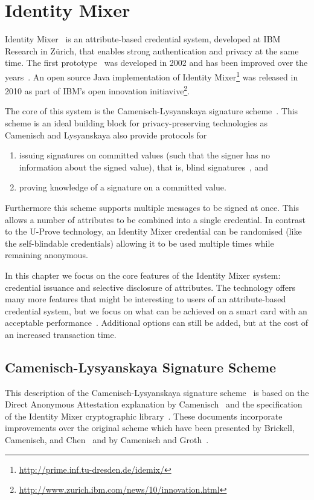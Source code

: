 \chapter{Identity Mixer}

Identity Mixer~\cite{IdemixCrypto2012} is an attribute-based credential system,
developed at IBM Research in Z\"urich, that enables strong authentication and
privacy at the same time. The first prototype~\cite{CamenischH02} was developed
in 2002 and has been improved over the years~\cite{}. An open source Java implementation
of Identity Mixer\footnote{\url{http://prime.inf.tu-dresden.de/idemix/}} was
released in 2010 as part of IBM's open innovation
initiavive\footnote{\url{http://www.zurich.ibm.com/news/10/innovation.html}}.

The core of this system is the Camenisch-Lysyanskaya signature
scheme~\cite{CamenischLysyanskaya2002,Lysyanskaya2002}. This scheme is an ideal
building block for privacy-preserving technologies as Camenisch and Lysyanskaya
also provide protocols for
\begin{enumerate}
  \item issuing signatures on committed values (such that the signer has no
    information about the signed value), that is, blind
    signatures~\cite{Chaum1983}, and
  \item proving knowledge of a signature on a committed value.
\end{enumerate}
Furthermore this scheme supports multiple messages to be signed at once. This
allows a number of attributes to be combined into a single credential. In
contrast to the U-Prove technology, an Identity Mixer credential can be
randomised (like the self-blindable credentials) allowing it to be used multiple
times while remaining anonymous.

In this chapter we focus on the core features of the Identity Mixer system:
credential issuance and selective disclosure of attributes. The technology
offers many more features that might be interesting to users of an
attribute-based credential system, but we focus on what can be achieved on a
smart card with an acceptable performance~\cite{VullersAlpar2013}. Additional
options can still be added, but at the cost of an increased transaction time.

\section{Camenisch-Lysyanskaya Signature Scheme}

This description of the Camenisch-Lysyanskaya signature
scheme~\cite{CamenischLysyanskaya2002,Lysyanskaya2002} is based on the Direct
Anonymous Attestation explanation by Camenisch~\cite{Camenisch2007} and the
specification of the Identity Mixer cryptographic
library~\cite{IdemixCrypto2012}. These documents incorporate improvements over
the original scheme which have been presented by Brickell, Camenisch, and
Chen~\cite{BrickellCC2004} and by Camenisch and Groth~\cite{CamenischGroth2004}.

